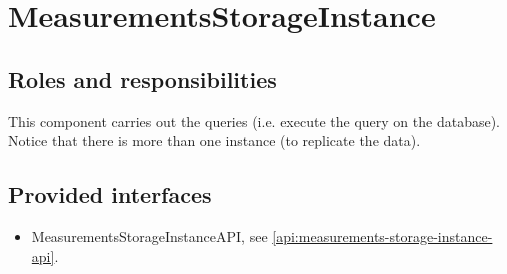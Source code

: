 \section{MeasurementsStorageInstance}
\label{element:measurements-storage-instance}

\subsection{Roles and responsibilities}

\npar This component carries out the queries (i.e. execute the query on the
database). Notice that there is more than one instance (to replicate the data).

\subsection{Provided interfaces}

\begin{itemize}
  \item MeasurementsStorageInstanceAPI, see
  \ref{api:measurements-storage-instance-api}.
\end{itemize}